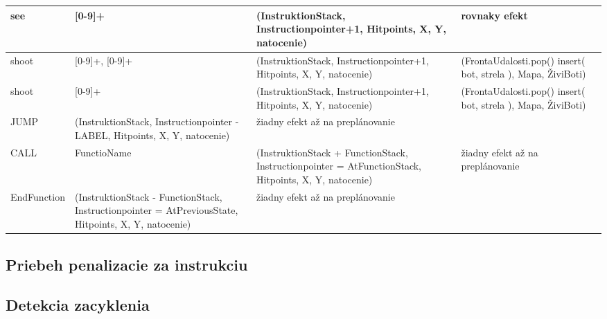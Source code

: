 \documentclass[a4paper,11pt,final]{report}
\begin{document}
\begin{table}[ht]
\begin{tabular}{|p{3cm}|p{3cm}|p{4cm}|p{4cm}|}
see & [0-9]+ &(InstruktionStack, Instructionpointer+1, Hitpoints, X, Y, natocenie)& rovnaky efekt \\\hline 
shoot & [0-9]+, [0-9]+ &(InstruktionStack, Instructionpointer+1, Hitpoints, X, Y, natocenie)& (FrontaUdalosti.pop() insert( bot, strela ), Mapa, ŽiviBoti) \\\hline 
shoot & [0-9]+ &(InstruktionStack, Instructionpointer+1, Hitpoints, X, Y, natocenie)& (FrontaUdalosti.pop() insert( bot, strela ), Mapa, ŽiviBoti) \\\hline 
\hline
\newpage
JUMP & (InstruktionStack, Instructionpointer - LABEL, Hitpoints, X, Y, natocenie) & žiadny efekt až na preplánovanie \\ \hline               %
CALL & FunctioName & (InstruktionStack + FunctionStack, Instructionpointer = AtFunctionStack, Hitpoints, X, Y, natocenie)& žiadny efekt až na preplánovanie \\\hline
EndFunction & (InstruktionStack - FunctionStack, Instructionpointer = AtPreviousState, Hitpoints, X, Y, natocenie)& žiadny efekt až na preplánovanie \\\hline
\hline                              %
\end{tabular}
\end{table}

\subsection{Priebeh penalizacie za instrukciu}
\subsection{Detekcia zacyklenia}
\end{document}
